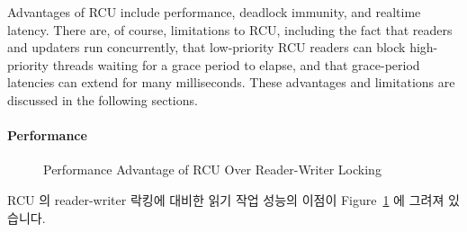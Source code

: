 Advantages of RCU include performance,
deadlock immunity, and realtime latency.
There are, of course, limitations to RCU, including the fact that
readers and updaters run concurrently, that low-priority RCU readers
can block high-priority threads waiting for a grace period to elapse,
and that grace-period latencies can extend for many milliseconds.
These advantages and limitations are discussed in the following sections.
\fi

\paragraph{Performance}

\begin{figure}[tb]
\begin{center}
\end{center}
\caption{Performance Advantage of RCU Over Reader-Writer Locking}
\label{fig:defer:Performance Advantage of RCU Over Reader-Writer Locking}
\end{figure}

RCU 의 reader-writer 락킹에 대비한 읽기 작업 성능의 이점이
Figure~\ref{fig:defer:Performance Advantage of RCU Over Reader-Writer Locking}
에 그려져 있습니다.

